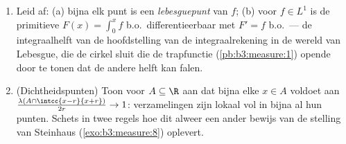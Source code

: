\begin{problem}
\begin{enumerate}[resume]
{        en $\norm h_1 < \varepsilon$
        (\cref{thm:b3:lp:density}); de verzameling waar de
        $\limsup_{r\to0}$ van de gemiddelde oscillatie $\delta$
        overtreft, ligt binnen $\{Mh > \delta/2\} \cup \{\abs h
        > \delta/2\}$, van  $O(\varepsilon/\delta)$; laat
        $\varepsilon \to 0$ gaan, en daarna $\delta \to 0$ langs
        een rij.)}
  \item Leid af: (a) bijna elk punt is een \emph{lebesguepunt}
        van $f$; (b) voor $f \in L^1$ is de primitieve $F(x) =
        \int_0^xf$ b.o.\ differentieerbaar met $F' = f$ b.o.\
        --- de integraalhelft van de hoofdstelling van de
        integraalrekening in de wereld van Lebesgue, die de
        cirkel sluit die de trapfunctie
        (\cref{pb:b3:measure:1}) opende door te tonen dat de
        andere helft kan falen.
  \item (Dichtheidspunten) Toon voor  $A \subseteq \R$
        aan dat bijna elke $x \in A$ voldoet aan
        $\frac{\lambda(A\cap\intcc{x-r}{x+r})}{2r} \to 1$:
         verzamelingen zijn lokaal vol in bijna al hun
        punten. Schets in twee regels hoe dit alweer een ander
        bewijs van de stelling van Steinhaus
        (\cref{exo:b3:measure:8}) oplevert.
\end{enumerate}


\end{problem}
